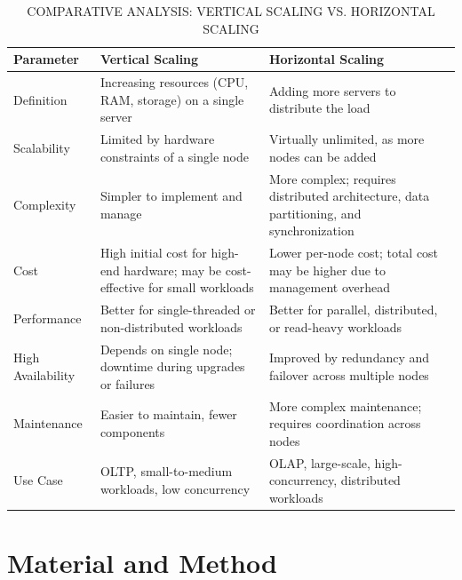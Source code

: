 \documentclass[conference]{IEEEtran}
\begin{document}
\begin{table}[htbp]
\centering
\small
\begin{tabular}{|p{2.4cm}|p{2.4cm}|p{2.4cm}|}
\hline
\textbf{Parameter} & \textbf{Vertical Scaling} & \textbf{Horizontal Scaling} \\
\hline
Definition & Increasing resources (CPU, RAM, storage) on a single server & Adding more servers to distribute the load \\
\hline
Scalability & Limited by hardware constraints of a single node & Virtually unlimited, as more nodes can be added \\
\hline
Complexity & Simpler to implement and manage & More complex; requires distributed architecture, data partitioning, and synchronization \\
\hline
Cost & High initial cost for high-end hardware; may be cost-effective for small workloads & Lower per-node cost; total cost may be higher due to management overhead \\
\hline
Performance & Better for single-threaded or non-distributed workloads & Better for parallel, distributed, or read-heavy workloads \\
\hline
High Availability & Depends on single node; downtime during upgrades or failures & Improved by redundancy and failover across multiple nodes \\
\hline
Maintenance & Easier to maintain, fewer components & More complex maintenance; requires coordination across nodes \\
\hline
Use Case & OLTP, small-to-medium workloads, low concurrency & OLAP, large-scale, high-concurrency, distributed workloads \\
\hline
\end{tabular}
\hline
\caption{COMPARATIVE ANALYSIS: VERTICAL SCALING VS. HORIZONTAL SCALING}
\label{tab:postgresql_research_summary}
\end{table}

\section{Material and Method}
\end{document}
